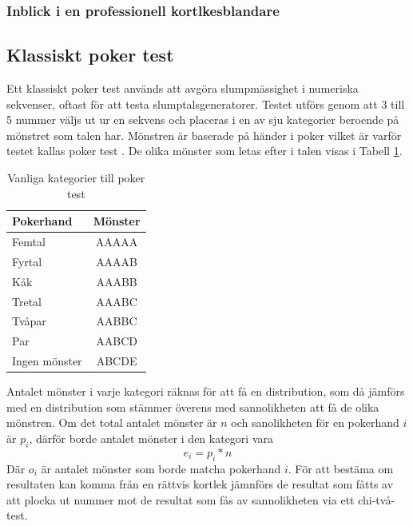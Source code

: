\documentclass[swedish,a4paper]{article}
\begin{document}
\subsubsection{Inblick i en professionell kortlkesblandare}
\label{sec:wheel}


\subsection{Klassiskt poker test}
\label{sec:poker_test}
Ett klassiskt poker test används att avgöra slump\-mässighet i numeriska 
sekvenser, oftast för att testa slumptalsgeneratorer. Testet utförs genom
att 3 till 5 nummer väljs ut ur en sekvens och placeras i en av sju
kategorier beroende på mönstret som talen har.  Mönstren är baserade på händer i poker vilket är varför testet kallas poker test \parencite{Abdel2014}. 
De olika mönster som letas efter i talen visas i Tabell \ref{tab:num_poker_hands}.
\begin{table}[H] 
	\centering
        \caption{Vanliga kategorier till poker test}
        \label{tab:num_poker_hands}
	\begin{tabular}{|l|c|}
	\hline 
	Pokerhand & Mönster \\ \hline  
	Femtal & AAAAA \\ \hline
	Fyrtal & AAAAB \\ \hline
	Kåk & AAABB \\ \hline
	Tretal & AAABC \\ \hline
	Tvåpar & AABBC \\ \hline
	Par & AABCD \\ \hline
    	Ingen mönster & ABCDE \\ \hline
	
\end{tabular}

\end{table}
\noindent
 Antalet mönster i varje kategori räknas för att få en distribution, som
 då jämförs med en distribution som stämmer överens med sannolikheten
 att få de olika mönstren. Om det total antalet mönster är $n$ och
 sanolikheten för en pokerhand $i$ är $p_i$, därför borde antalet mönster i
 den kategori vara $$e_i = p_i * n$$ Där $o_i$ är antalet mönster som
 borde matcha pokerhand $i$. För att bestäma om resultaten kan komma
 från en rättvis kortlek jämnförs de resultat som fåtts av att plocka
 ut nummer mot de resultat som fås av sannolikheten via ett chi-två-test.

\begin{equation*}
\end{equation*}
\end{document}
